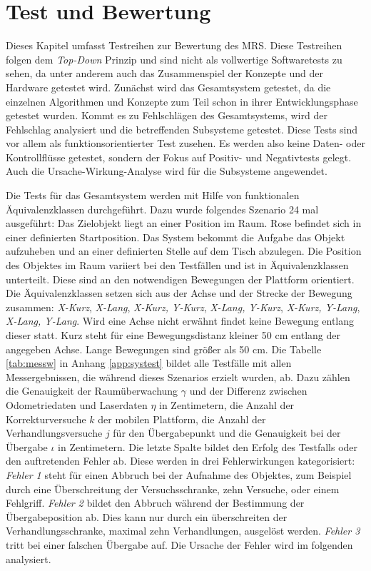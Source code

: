 \section{Test und Bewertung}
\label{sec:test}
Dieses Kapitel umfasst Testreihen zur Bewertung des MRS. Diese Testreihen folgen dem \textit{Top-Down} Prinzip und sind nicht als vollwertige Softwaretests zu sehen, da unter anderem auch das Zusammenspiel der Konzepte und der Hardware getestet wird. Zunächst wird das Gesamtsystem getestet, da die einzelnen Algorithmen und Konzepte zum Teil schon in ihrer Entwicklungsphase getestet wurden. Kommt es zu Fehlschlägen des Gesamtsystems, wird der Fehlschlag analysiert und die betreffenden Subsysteme getestet. Diese Tests sind vor allem als funktionsorientierter Test zusehen. Es werden also keine Daten- oder Kontrollflüsse getestet, sondern der Fokus auf Positiv- und Negativtests gelegt. Auch die Ursache-Wirkung-Analyse wird für die Subsysteme angewendet. 

Die Tests für das Gesamtsystem werden mit Hilfe von funktionalen Äquivalenzklassen durchgeführt. Dazu wurde folgendes Szenario 24 mal ausgeführt: Das Zielobjekt liegt an einer Position im Raum. Rose befindet sich in einer definierten Startposition. Das System bekommt die Aufgabe das Objekt aufzuheben und an einer definierten Stelle auf dem Tisch abzulegen. Die Position des Objektes im Raum variiert bei den Testfällen und ist in Äquivalenzklassen unterteilt. Diese sind an den notwendigen Bewegungen der Plattform orientiert. Die Äquivalenzklassen setzen sich aus der Achse und der Strecke der Bewegung zusammen: \textit{ X-Kurz}, \textit{ X-Lang}, \textit{ X-Kurz, Y-Kurz}, \textit{ X-Lang, Y-Kurz}, \textit{ X-Kurz, Y-Lang}, \textit{ X-Lang, Y-Lang}. Wird eine Achse nicht erwähnt findet keine Bewegung entlang dieser statt. Kurz steht für eine Bewegungsdistanz kleiner 50 cm entlang der angegeben Achse. Lange Bewegungen sind größer als 50 cm. Die Tabelle \ref{tab:messw} in Anhang \ref{app:systest} bildet alle Testfälle mit allen Messergebnissen, die während dieses Szenarios erzielt wurden, ab. Dazu zählen die Genauigkeit der Raumüberwachung $\gamma$ und der Differenz zwischen Odometriedaten und Laserdaten $\eta$ in Zentimetern, die Anzahl der Korrekturversuche $k$ der mobilen Plattform, die Anzahl der Verhandlungsversuche $j$ für den Übergabepunkt und die Genauigkeit bei der Übergabe $\iota$ in Zentimetern. Die letzte Spalte bildet den Erfolg des Testfalls oder den auftretenden Fehler ab. Diese werden in drei Fehlerwirkungen kategorisiert: \textit{Fehler 1} steht für einen Abbruch bei der Aufnahme des Objektes, zum Beispiel durch eine Überschreitung der Versuchsschranke, zehn Versuche, oder einem Fehlgriff. \textit{Fehler 2} bildet den Abbruch während der Bestimmung der Übergabeposition ab. Dies kann nur durch ein überschreiten der Verhandlungsschranke, maximal zehn Verhandlungen, ausgelöst werden. \textit{Fehler 3} tritt bei einer falschen Übergabe auf. Die Ursache der Fehler wird im folgenden analysiert. 

